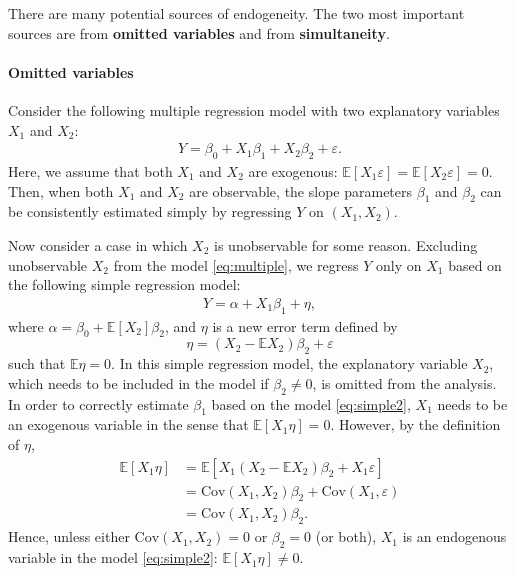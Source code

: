 \documentclass[10.5pt, A4paper, openany, uplatex]{book}
\newcommand{\eps}{\varepsilon}
\newcommand{\E}{\mathbb{E}}
\newcommand{\Cov}{\mathrm{Cov}}
\numberwithin{equation}{section}
\begin{document}
There are many potential sources of endogeneity.
The two most important sources are from \textbf{omitted variables} and from \textbf{simultaneity}. 

\paragraph{Omitted variables}
Consider the following multiple regression model with two explanatory variables $X_1$ and $X_2$:
\begin{align}\label{eq:multiple}
Y = \beta_0 + X_1 \beta_1 + X_2 \beta_2 + \eps.
\end{align}
Here, we assume that both $X_1$ and $X_2$ are exogenous: $\E[ X_1 \eps ] = \E [ X_2 \eps ] = 0$.
Then, when both $X_1$ and $X_2$ are observable, the slope parameters  $\beta_1$ and $\beta_2$ can be consistently estimated simply by regressing $Y$ on $(X_1, X_2)$.

Now consider a case in which $X_2$ is unobservable for some reason.
Excluding unobservable $X_2$ from the model \eqref{eq:multiple}, we regress $Y$ only on $X_1$ based on the following simple regression model:
\begin{align}\label{eq:simple2}
Y = \alpha +X_1 \beta_1 + \eta, 
\end{align}
where $\alpha = \beta_0 + \E[ X_2 ] \beta_2$, and $\eta$ is a new error term defined by
\[
\eta = ( X_2 - \E X_2  ) \beta_2 + \eps
\]
such that $\E\eta = 0$.
In this simple regression model, the explanatory variable $X_2$, which needs to be included in the model if $\beta_{2}\neq 0$, is omitted from the analysis. 
In order to correctly estimate $\beta_1$ based on the model \eqref{eq:simple2}, $X_1$ needs to be an exogenous variable in the sense that	$\E[ X_1 \eta ]  = 0$.
However, by the definition of $\eta$,
\begin{align*}
	\E[  X_1 \eta ]   
	& = \E\left[  X_1 \left(  X_2 - \E X_2   \right) \beta_2 + X_1 \eps \right] \\
	& = \Cov( X_1, X_2)  \beta_2 + \Cov( X_1, \eps)\\
	& = \Cov( X_1, X_2)  \beta_2.
\end{align*}
Hence, unless either $\Cov( X_1, X_2 ) = 0$ or $\beta_2 = 0$ (or both), $X_1$ is an endogenous variable in the model \eqref{eq:simple2}: $\E[X_1 \eta] \neq 0$.
\end{document}
